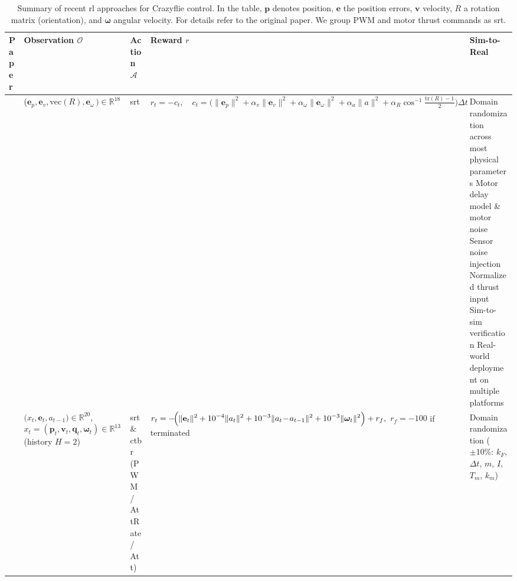 \begin{table*}[!b]
  \centering
  \caption[Summary of \gls{rl} approaches]{Summary of recent \gls{rl} approaches for Crazyflie control. In the table, $\mathbf{p}$ denotes position, $\mathbf{e}$ the position errors, $\mathbf{v}$ velocity, $R$ a rotation matrix (orientation), and $\boldsymbol{\omega}$ angular velocity. For details refer to the original paper. We group PWM and motor thrust commands as \gls{srt}.}
  \label{tab:rl_comparison}
  \scriptsize
  \begin{tabularx}{\textwidth}{p{0.7cm} p{3.0cm} p{1.3cm} p{3.5cm} X}
    \toprule
    \rowcolor{white}
    \textbf{Paper} & \textbf{Observation $\mathcal{O}$} & \textbf{Action $\mathcal{A}$} & \textbf{Reward $r$} & \textbf{Sim-to-Real} \\
    \midrule
    \cite{molchanov_sim--multi-real_2019} & 
    ($\mathbf e_p,\mathbf e_v,\mathrm{vec}(R),\mathbf e_\omega\,)\in\mathbb R^{18} $ & 
    \gls{srt}  & 
      \(\displaystyle
    r_t=-c_t,\quad
    c_t=\bigl(\|\mathbf e_p\|^2+\alpha_v\|\mathbf e_v\|^2+\alpha_\omega\|\mathbf e_\omega\|^2+\alpha_a\|a\|^2+\alpha_R\cos^{-1}\!\tfrac{\mathrm{tr}(R)-1}{2}\bigr)\Delta t
    \) 
    &
     Domain randomization across most physical parameters\newline
      Motor delay model \& motor noise\newline
      Sensor noise injection\newline
      Normalized thrust input\newline
      Sim-to-sim verification\newline
      Real-world deployment on multiple platforms  \\
    \cite{gronauer_using_2022} & 
    $\bigl(x_t,\mathbf{e}_t,a_{t-1}\bigr)\!\in\!\mathbb{R}^{20}$, \newline 
    $x_t=(\mathbf{p}_t,\mathbf{v}_t,\mathbf{q}_t,\boldsymbol{\omega}_t)\!\in\!\mathbb{R}^{13}$ \newline 
    (history $H{=}2$) & 
    \gls{srt} \& \gls{ctbr}\newline 
    (PWM / AttRate / Att) & 
    $\displaystyle r_t= -\!\Bigl(\|\mathbf{e}_t\|^{2} + 10^{-4}\|a_t\|^{2} + 10^{-3}\|a_t\!-\!a_{t-1}\|^{2} + 10^{-3}\|\boldsymbol{\omega}_t\|^{2}\Bigr) + r_f,$ \newline 
    $r_f = -100$ if terminated &
    Domain randomization ($\pm10\%$: $k_F$, $\Delta t$, $m$, $I$, $T_m$, $k_m$) \newline

\end{tabularx}
\end{table*}

